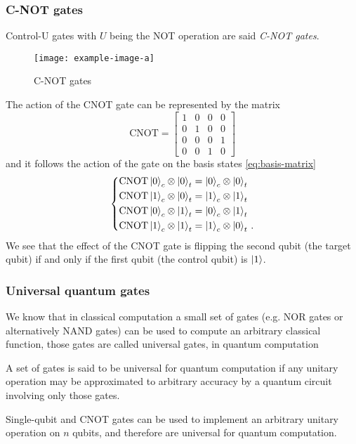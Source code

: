 \subsubsection{C-NOT gates}
Control-U gates with $U$ being the NOT operation are said \emph{C-NOT gates}.
\begin{figure}[htb]
\centering
\texttt{[image: example-image-a]}
\caption{C-NOT gates}
\label{fig:controlled-note}
\end{figure}
The action of the CNOT gate can be represented by the matrix
\begin{equation*}
      \text{CNOT} =  \begin{bmatrix}
    1 & 0 & 0 & 0\\
    0 & 1 & 0 & 0 \\
    0 & 0 & 0 & 1 \\
    0 & 0 & 1 & 0
    \end{bmatrix} 
\end{equation*}
and it follows the action of the gate on the basis states \eqref{eq:basis-matrix}
\begin{equation*}
\left\{
\begin{aligned}
&\text{CNOT} \ket{0}_c \otimes \ket{0}_t = \ket{0}_c \otimes \ket{0}_t \\
&\text{CNOT} \ket{1}_c \otimes \ket{0}_t = \ket{1}_c \otimes \ket{1}_t \\
&\text{CNOT} \ket{0}_c \otimes \ket{1}_t = \ket{0}_c \otimes \ket{1}_t \\
&\text{CNOT} \ket{1}_c \otimes \ket{1}_t = \ket{1}_c \otimes \ket{0}_t\,.
\end{aligned}
\right.
\end{equation*}
We see that the effect of the CNOT gate is flipping the second qubit (the target qubit) if and only if the first qubit (the control qubit) is $\ket{1}$.
\subsubsection{Universal quantum gates}
We know that in classical computation a small set of gates (e.g. NOR gates or alternatively NAND gates) can be used to compute an arbitrary classical function, those gates are called universal gates, in quantum computation
\begin{defn}
A set of gates is said to be universal for quantum computation if any unitary operation may be approximated to arbitrary accuracy by a quantum circuit involving only those gates.
\end{defn}
\begin{theorem}
Single-qubit and CNOT gates can be used to implement an arbitrary unitary operation on $n$ qubits,
and therefore are universal for quantum computation. \cite[191]{NielsenChuang}
\end{theorem}

